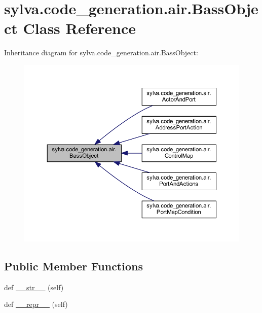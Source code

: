 \hypertarget{classsylva_1_1code__generation_1_1air_1_1_bass_object}{}\section{sylva.\+code\+\_\+generation.\+air.\+Bass\+Object Class Reference}
\label{classsylva_1_1code__generation_1_1air_1_1_bass_object}


Inheritance diagram for sylva.\+code\+\_\+generation.\+air.\+Bass\+Object\+:\nopagebreak
\begin{figure}[H]
\begin{center}
\leavevmode
\includegraphics[width=350pt]{classsylva_1_1code__generation_1_1air_1_1_bass_object__inherit__graph}
\end{center}
\end{figure}
\subsection*{Public Member Functions}
\begin{DoxyCompactItemize}
\item 
def \hyperlink{classsylva_1_1code__generation_1_1air_1_1_bass_object_a2c164720220479369c29db97b67aabe8}{\+\_\+\+\_\+str\+\_\+\+\_\+} (self)
\item 
def \hyperlink{classsylva_1_1code__generation_1_1air_1_1_bass_object_a17548b84b2a55240a429506aed418292}{\+\_\+\+\_\+repr\+\_\+\+\_\+} (self)
\end{DoxyCompactItemize}


